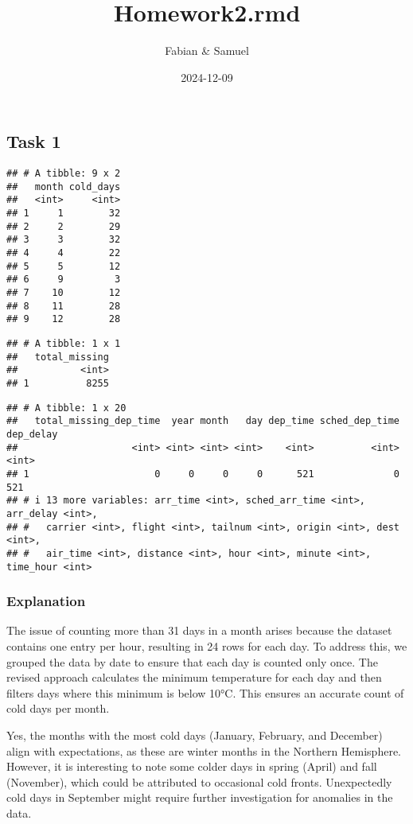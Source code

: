 \documentclass[
]{article}
\title{Homework2.rmd}
\author{Fabian \& Samuel}
\date{2024-12-09}
\begin{document}
\maketitle

\subsection{Task 1}\label{task-1}

\begin{verbatim}
## # A tibble: 9 x 2
##   month cold_days
##   <int>     <int>
## 1     1        32
## 2     2        29
## 3     3        32
## 4     4        22
## 5     5        12
## 6     9         3
## 7    10        12
## 8    11        28
## 9    12        28
\end{verbatim}

\begin{verbatim}
## # A tibble: 1 x 1
##   total_missing
##           <int>
## 1          8255
\end{verbatim}

\begin{verbatim}
## # A tibble: 1 x 20
##   total_missing_dep_time  year month   day dep_time sched_dep_time dep_delay
##                    <int> <int> <int> <int>    <int>          <int>     <int>
## 1                      0     0     0     0      521              0       521
## # i 13 more variables: arr_time <int>, sched_arr_time <int>, arr_delay <int>,
## #   carrier <int>, flight <int>, tailnum <int>, origin <int>, dest <int>,
## #   air_time <int>, distance <int>, hour <int>, minute <int>, time_hour <int>
\end{verbatim}

\subsubsection{Explanation}\label{explanation}

The issue of counting more than 31 days in a month arises because the
dataset contains one entry per hour, resulting in 24 rows for each day.
To address this, we grouped the data by date to ensure that each day is
counted only once. The revised approach calculates the minimum
temperature for each day and then filters days where this minimum is
below 10°C. This ensures an accurate count of cold days per month.

Yes, the months with the most cold days (January, February, and
December) align with expectations, as these are winter months in the
Northern Hemisphere. However, it is interesting to note some colder days
in spring (April) and fall (November), which could be attributed to
occasional cold fronts. Unexpectedly cold days in September might
require further investigation for anomalies in the data.
\end{document}
